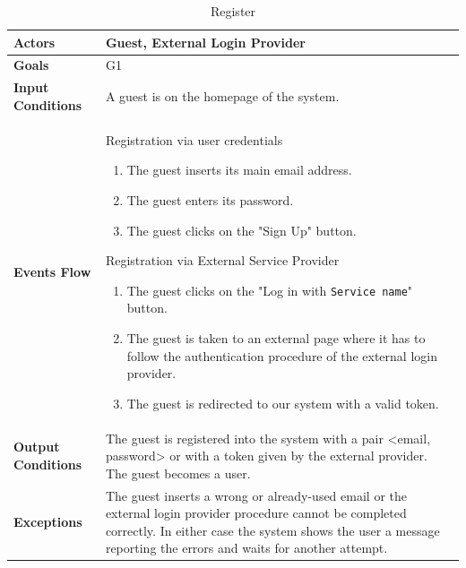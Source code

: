 \begin{table}[H]
	\centering
	\def\arraystretch{1.5}
	\begin{tabular}{|p{7cm}|p{7cm}|}
		\hline
		\textbf{Actors}            & Guest, External Login Provider		    \\ \hline
		\textbf{Goals}             & G1           \\ \hline
		\textbf{Input Conditions}  & A guest is on the homepage of the system.           \\ \hline
		\textbf{Events Flow}       &   
		Registration via user credentials
		\begin{enumerate}
			\item The guest inserts its main email address.
			\item The guest enters its password.
			\item The guest clicks on the "Sign Up" button.
		\end{enumerate}
		Registration via External Service Provider
		\begin{enumerate}
			\item The guest clicks on the "Log in with \texttt{Service name}" button.
			\item The guest is taken to an external page where it has to follow the authentication procedure of the external login provider.
			\item The guest is redirected to our system with a valid token.
		\end{enumerate}       \\ \hline
		\textbf{Output Conditions} & The guest is registered into the system with a pair <email, password> or with a token given by the external provider. The guest becomes a user.          \\ \hline
		\textbf{Exceptions}        & The guest inserts a wrong or already-used email or the external login provider procedure cannot be completed correctly. In either case the system shows the user a message reporting the errors and waits for another attempt.            \\ \hline
	\end{tabular}
	\caption{Register}
\end{table}

